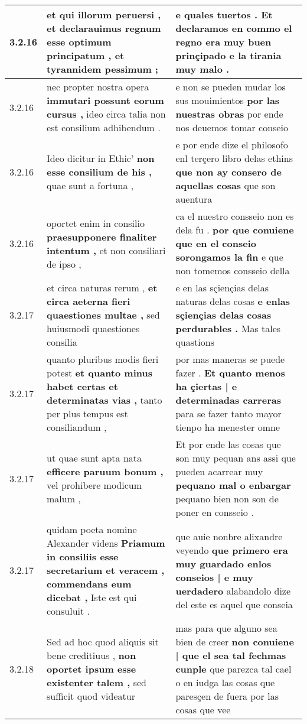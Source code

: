 \begin{tabular}{|p{1cm}|p{6.5cm}|p{6.5cm}|}
3.2.16 & et qui illorum peruersi , \textbf{ et declarauimus regnum esse optimum principatum , } et tyrannidem pessimum ; & e quales tuertos . \textbf{ Et declaramos en commo el regno era muy buen prinçipado } e la tirania muy malo . \\\hline
3.2.16 & nec propter nostra opera \textbf{ immutari possunt eorum cursus , } ideo circa talia non est consilium adhibendum . & e non se pueden mudar los sus mouimientos \textbf{ por las nuestras obras } por ende nos deuemos tomar conseio \\\hline
3.2.16 & Ideo dicitur in Ethic’ \textbf{ non esse consilium de his , } quae sunt a fortuna , & e por ende dize el philosofo enl terçero libro delas ethins \textbf{ que non ay consero de aquellas cosas } que son auentura \\\hline
3.2.16 & oportet enim in consilio \textbf{ praesupponere finaliter intentum , } et non consiliari de ipso , & ca el nuestro consseio non es dela fu . \textbf{ por que conuiene que en el conseio sorongamos la fin } e que non tomemos consseio della \\\hline
3.2.17 & et circa naturas rerum , \textbf{ et circa aeterna fieri quaestiones multae , } sed huiusmodi quaestiones consilia & e en las sçiençias delas naturas delas cosas \textbf{ e enlas sçiençias delas cosas perdurables . } Mas tales quastions \\\hline
3.2.17 & quanto pluribus modis fieri potest \textbf{ et quanto minus habet certas et determinatas vias , } tanto per plus tempus est consiliandum , & por mas maneras se puede fazer . \textbf{ Et quanto menos ha çiertas | e determinadas carreras } para se fazer tanto mayor tienpo ha menester omne \\\hline
3.2.17 & ut quae sunt apta nata \textbf{ efficere paruum bonum , } vel prohibere modicum malum , & Et por ende las cosas que son muy pequan ans assi que pueden acarrear muy \textbf{ pequano mal o enbargar } pequano bien non son de poner en consseio . \\\hline
3.2.17 & quidam poeta nomine Alexander videns \textbf{ Priamum in consiliis esse secretarium et veracem , commendans eum dicebat , } Iste est qui consuluit . & que auie nonbre alixandre veyendo \textbf{ que primero era muy guardado enlos conseios | e muy uerdadero } alabandolo dize del este es aquel que conseia \\\hline
3.2.18 & Sed ad hoc quod aliquis sit bene creditiuus , \textbf{ non oportet ipsum esse existenter talem , } sed sufficit quod videatur & mas para que alguno sea bien de creer \textbf{ non conuiene | que el sea tal fechmas cunple } que parezca tal cael o en iudga las cosas que paresçen de fuera por las cosas que vee \\\hline

\end{tabular}
